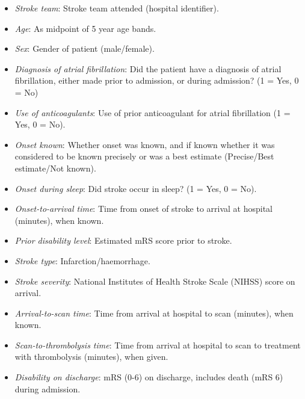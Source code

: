 \begin{itemize}

    \item \textit{Stroke team}: Stroke team attended (hospital identifier).

    \item \textit{Age}: As midpoint of 5 year age bands.

    \item \textit{Sex}: Gender of patient (male/female).

    \item \textit{Diagnosis of atrial fibrillation}: Did the patient have a diagnosis of atrial fibrillation, either made prior to admission, or during admission? (1 = Yes, 0 = No)

    \item \textit{Use of anticoagulants}: Use of prior anticoagulant for atrial fibrillation (1 = Yes, 0 = No).

    \item \textit{Onset known}: Whether onset was known, and if known whether it was considered to be known precisely or was a best estimate (Precise/Best estimate/Not known).

    \item \textit{Onset during sleep}: Did stroke occur in sleep? (1 = Yes, 0 = No).

    \item \textit{Onset-to-arrival time}: Time from onset of stroke to arrival at hospital (minutes), when known.

    \item \textit{Prior disability level}: Estimated mRS score prior to stroke.

    \item \textit{Stroke type}: Infarction/haemorrhage.

    \item \textit{Stroke severity}: National Institutes of Health Stroke Scale (NIHSS) score on arrival.

    \item \textit{Arrival-to-scan time}: Time from arrival at hospital to scan (minutes), when known.

    \item \textit{Scan-to-thrombolysis time}: Time from arrival at hospital to scan to treatment with thrombolysis (minutes), when given.

    \item \textit{Disability on discharge}: mRS (0-6) on discharge, includes death (mRS 6) during admission.
    
\end{itemize}

